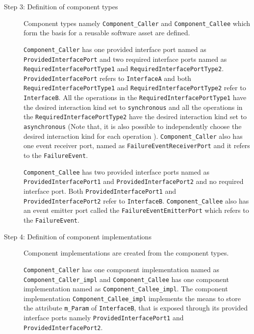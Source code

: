\begin{description}
\item [Step 3: Definition of component types] Component types namely \texttt{Component\allowbreak\_Caller} and \texttt{Component\allowbreak\_Callee} which form the basis for a reusable software asset are defined. 

\texttt{Component\allowbreak\_Caller} has one provided interface port named as \texttt{Provided\allowbreak Interface\allowbreak Port} and two required interface ports named as \texttt{Required\allowbreak Interface\allowbreak PortType1} and \texttt{Required\allowbreak Interface\allowbreak PortType2}. \texttt{Provided\allowbreak Interface\allowbreak Port} refers to \texttt{InterfaceA} and both \texttt{Required\allowbreak Interface\allowbreak PortType1} and \texttt{Required\allowbreak Interface\allowbreak PortType2} refer to \texttt{InterfaceB}. All the operations in the \texttt{Required\allowbreak Interface\allowbreak PortType1} have the desired interaction kind set to \texttt{synchronous} and all the operations in the \texttt{Required\allowbreak Interface\allowbreak PortType2} have the desired interaction kind set to \texttt{asynchronous} (Note that, it is also possible to independently choose the desired interaction kind for each operation \cite{SpecMetamodel}). \texttt{Component\allowbreak\_Caller} also has one event receiver port, named as \texttt{FailureEvent\allowbreak ReceiverPort} and it refers to the \texttt{FailureEvent}.

\texttt{Component\_Callee} has two provided interface ports named as \texttt{Provided\allowbreak Interface\allowbreak Port1} and \texttt{Provided\allowbreak Interface\allowbreak Port2} and no required interface port. Both \texttt{Provided\allowbreak Interface\allowbreak Port1} and \texttt{Provided\allowbreak Interface\allowbreak Port2} refer to \texttt{InterfaceB}. \texttt{Component\allowbreak\_Callee} also has an event emitter port called the \texttt{FailureEvent\allowbreak EmitterPort} which refers to the \texttt{FailureEvent}.

\item [Step 4: Definition of component implementations] Component implementations are created from the component types.

\texttt{Component\allowbreak\_Caller} has one component implementation named as \texttt{Component\allowbreak\_Caller\_impl} and \texttt{Component\allowbreak\_Callee} has one component implementation named as \texttt{Component\allowbreak\_Callee\_impl}. The component implementation \texttt{Component\allowbreak\_Callee\_impl} implements the means to store the attribute \texttt{m\_Param} of \texttt{InterfaceB}, that is exposed through its provided interface ports namely \texttt{Provided\allowbreak Interface\allowbreak Port1} and \texttt{Provided\allowbreak Interface\allowbreak Port2}.


\end{description}
